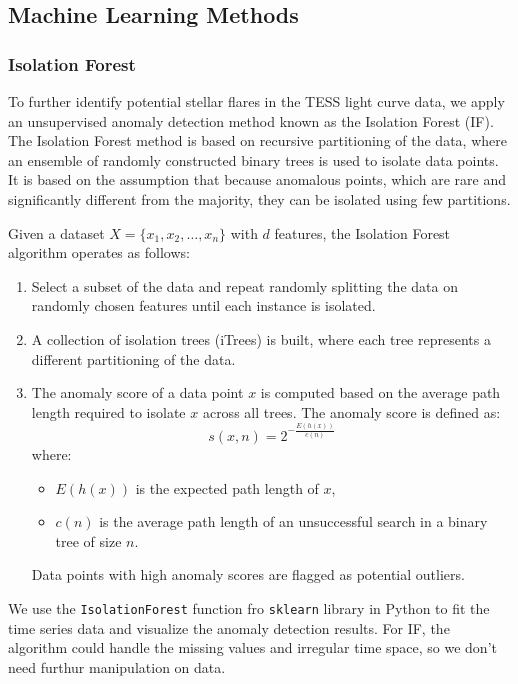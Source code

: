 \documentclass[
]{article}
\begin{document}
\subsection{Machine Learning Methods}\label{machine-learning-methods}

\subsubsection{Isolation Forest}\label{isolation-forest}

To further identify potential stellar flares in the TESS light curve data, we apply an unsupervised anomaly detection method known as the Isolation Forest (IF). The Isolation Forest method is based on recursive partitioning of the data, where an ensemble of randomly constructed binary trees is used to isolate data points. It is based on the assumption that because anomalous points, which are rare and significantly different from the majority, they can be isolated using few partitions.

Given a dataset \(X = \{x_1, x_2, \dots, x_n\}\) with \(d\) features, the Isolation Forest algorithm operates as follows:

\begin{enumerate}
    \item Select a subset of the data and repeat randomly splitting the data on randomly chosen features until each instance is isolated.
    \item A collection of isolation trees (iTrees) is built, where each tree represents a different partitioning of the data.
    \item The anomaly score of a data point $x$ is computed based on the average path length required to isolate $x$ across all trees. The anomaly score is defined as:
    \begin{equation}
        s(x, n) = 2^{-\frac{E(h(x))}{c(n)}}
    \end{equation}
    where:
    \begin{itemize}
        \item $E(h(x))$ is the expected path length of $x$,
        \item $c(n)$ is the average path length of an unsuccessful search in a binary tree of size $n$.
    \end{itemize}
    Data points with high anomaly scores are flagged as potential outliers.
\end{enumerate}

We use the \texttt{IsolationForest} function fro \texttt{sklearn} library in Python to fit the time series data and visualize the anomaly detection results. For IF, the algorithm could handle the missing values and irregular time space, so we don't need furthur manipulation on data.
\end{document}
